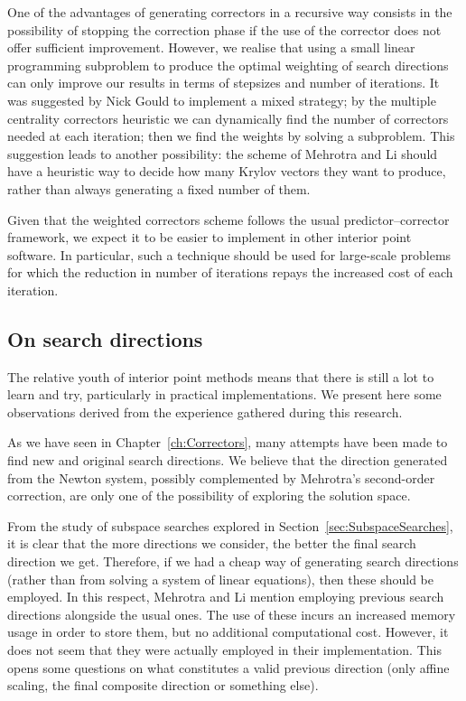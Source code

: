 One of the advantages of generating correctors in a recursive way
consists in the possibility of stopping the correction phase
if the use of the corrector does not offer sufficient improvement.
However, we realise that using a small linear programming subproblem
to produce the optimal weighting of search directions can only improve
our results in terms of stepsizes and number of iterations.
It was suggested by Nick Gould to implement a mixed strategy;
by the multiple centrality correctors heuristic we can dynamically
find the number of correctors needed at each iteration; then we find
the weights by solving a subproblem.
This suggestion leads to another possibility: the scheme of
Mehrotra and Li should have a heuristic way to decide how many
Krylov vectors they want to produce, rather than always generating
a fixed number of them.

Given that the weighted correctors scheme follows the usual 
predictor--corrector framework,
we expect it to be easier to implement in other interior point software.
In particular, such a technique should be used for large-scale problems
for which the reduction in number of iterations repays the
increased cost of each iteration. 

%
%
\subsection*{On search directions}

The relative youth of interior point methods means that there is still
a lot to learn and try, particularly in practical implementations.
We present here some observations derived from the experience
gathered during this research.

As we have seen in Chapter~\ref{ch:Correctors}, many attempts
have been made to find new and original search directions.
We believe that the direction generated from the Newton system,
possibly complemented by Mehrotra's second-order correction,
are only one of the possibility of exploring the solution space.

From the study of subspace searches explored in
Section~\ref{sec:SubspaceSearches}, it is clear that the more 
directions we consider, the better the final search direction 
we get. Therefore, if we had a cheap way of generating search
directions (rather than from solving a system of linear equations),
then these should be employed.
In this respect, Mehrotra and Li \cite{MehrotraLi} 
mention employing previous search directions alongside the usual ones. 
The use of these incurs an increased memory usage 
in order to store them, but no additional computational cost.
However, it does not seem that they were actually employed in
their implementation.
This opens some questions on what constitutes a valid
previous direction (only affine scaling, the final composite direction
or something else).

